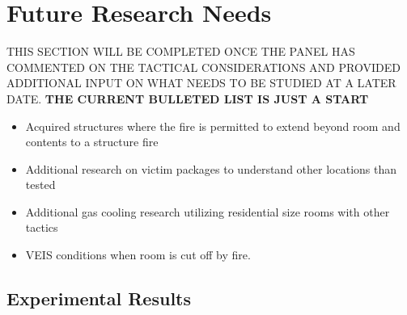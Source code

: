\documentclass[12pt,oneside]{book}
\begin{document}
\chapter{Future Research Needs}

THIS SECTION WILL BE COMPLETED ONCE THE PANEL HAS COMMENTED ON THE TACTICAL CONSIDERATIONS AND PROVIDED ADDITIONAL INPUT ON WHAT NEEDS TO BE STUDIED AT A LATER DATE. \bf{THE CURRENT BULLETED LIST IS JUST A START}

\normalfont

\begin{itemize}
	\item{Acquired structures where the fire is permitted to extend beyond room and contents to a structure fire}
	\item{Additional research on victim packages to understand other locations than tested}
	\item{Additional gas cooling research utilizing residential size rooms with other tactics}
	\item{VEIS conditions when room is cut off by fire.}
\end{itemize}


	




\begin{appendices}








\chapter{Experimental Results} \label{App:Results}
\renewcommand{\thesubsection}{\Alph{section}}


% 

\end{appendices}
\end{document}

